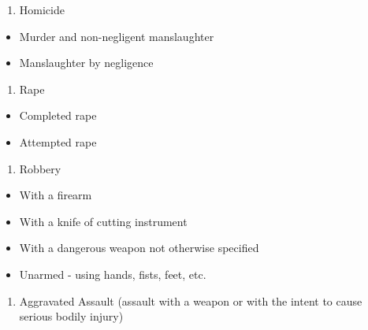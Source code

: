 \documentclass[
  12pt,
  openany]{book}
\providecommand{\tightlist}{%
  \setlength{\itemsep}{0pt}\setlength{\parskip}{0pt}}
\begin{document}
\begin{enumerate}
\def\labelenumi{\arabic{enumi}.}
\tightlist
\item
  Homicide\\
\end{enumerate}

\begin{itemize}
\tightlist
\item
  Murder and non-negligent manslaughter\\
\item
  Manslaughter by negligence\\
\end{itemize}

\begin{enumerate}
\def\labelenumi{\arabic{enumi}.}
\setcounter{enumi}{1}
\tightlist
\item
  Rape\\
\end{enumerate}

\begin{itemize}
\tightlist
\item
  Completed rape\\
\item
  Attempted rape\\
\end{itemize}

\begin{enumerate}
\def\labelenumi{\arabic{enumi}.}
\setcounter{enumi}{2}
\tightlist
\item
  Robbery\\
\end{enumerate}

\begin{itemize}
\tightlist
\item
  With a firearm\\
\item
  With a knife of cutting instrument\\
\item
  With a dangerous weapon not otherwise specified\\
\item
  Unarmed - using hands, fists, feet, etc.\\
\end{itemize}

\begin{enumerate}
\def\labelenumi{\arabic{enumi}.}
\setcounter{enumi}{3}
\tightlist
\item
  Aggravated Assault (assault with a weapon or with the intent to cause serious bodily injury)\\
\end{enumerate}
\end{document}
